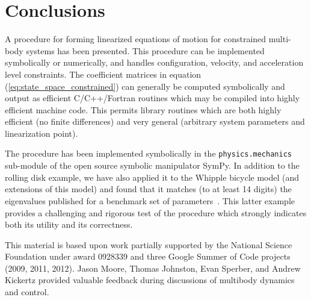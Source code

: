 \documentclass[smallcondensed,final]{svjour3}                     %
\begin{document}
\section{Conclusions}
A procedure for forming linearized equations of motion for constrained
multi-body systems has been presented. This procedure can be implemented
symbolically or numerically, and handles configuration, velocity, and
acceleration level constraints. The coefficient matrices in equation
(\ref{eq:state_space_constrained}) can generally be computed symbolically and
output as efficient C/C++/Fortran routines which may be compiled into highly
efficient machine code. This permits library routines which are both highly
efficient (no finite differences) and very general (arbitrary system parameters
and linearization point).

The procedure has been implemented symbolically in the
\texttt{physics.mechanics} sub-module of the open source symbolic manipulator
SymPy\cite{SymPy2012}. In addition to the rolling disk example, we have also
applied it to the Whipple bicycle model (and extensions of this model) and
found that it matches (to at least 14 digits) the eigenvalues published for a
benchmark set of parameters~\cite{Meijaard2007}. This latter example provides a
challenging and rigorous test of the procedure which strongly indicates both
its utility and its correctness.

\begin{acknowledgements}
 This material is based upon work partially supported by the National Science
 Foundation under award 0928339 and three Google Summer of Code projects (2009,
 2011, 2012). Jason Moore, Thomas Johnston, Evan Sperber, and Andrew Kickertz
 provided valuable feedback during discussions of multibody dynamics and
 control.
\end{acknowledgements}

\appendix
\end{document}
